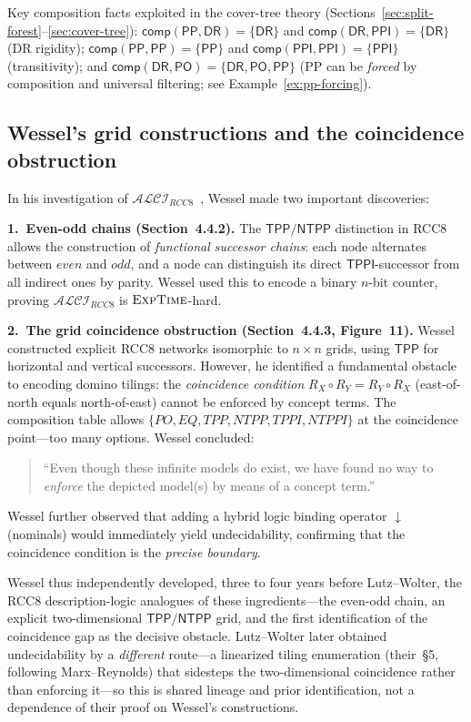 \documentclass[
]{ceurart}
\theoremstyle{definition}
\newcommand{\ALCIRCC}[1]{\ensuremath{\mathcal{ALCI}_{\mathit{RCC#1}}}}
\newcommand{\DR}{\ensuremath{\mathsf{DR}}}
\newcommand{\PO}{\ensuremath{\mathsf{PO}}}
\newcommand{\PP}{\ensuremath{\mathsf{PP}}}
\newcommand{\PPI}{\ensuremath{\mathsf{PPI}}}
\newcommand{\TPP}{\ensuremath{\mathsf{TPP}}}
\newcommand{\NTPP}{\ensuremath{\mathsf{NTPP}}}
\newcommand{\TPPI}{\ensuremath{\mathsf{TPPI}}}
\newcommand{\comp}{\ensuremath{\mathsf{comp}}}
\newcommand{\EXPTIME}{\textsc{ExpTime}}
\begin{document}
\noindent
Key composition facts exploited in the cover-tree theory
(Sections~\ref{sec:split-forest}--\ref{sec:cover-tree}):
$\comp(\PP,\DR) = \{\DR\}$ and $\comp(\DR,\PPI) = \{\DR\}$
(DR rigidity);
$\comp(\PP,\PP) = \{\PP\}$ and $\comp(\PPI,\PPI) = \{\PPI\}$
(transitivity);
and $\comp(\DR,\PO) = \{\DR,\PO,\PP\}$
(PP can be \emph{forced} by composition and universal filtering;
see Example~\ref{ex:pp-forcing}).

\subsection{Wessel's grid constructions and the coincidence obstruction}
\label{sec:wessel-grid}

In his investigation of $\ALCIRCC{8}$~\cite{Wessel2003}, Wessel
made two important discoveries:

\medskip\noindent\textbf{1.\ Even-odd chains (Section~4.4.2).}
The $\TPP/\NTPP$ distinction in RCC8 allows the construction of
\emph{functional successor chains}: each node alternates between
$\mathit{even}$ and $\mathit{odd}$, and a node can distinguish its
direct $\TPPI$-successor from all indirect ones by parity.
Wessel used this to encode a binary $n$-bit counter, proving
$\ALCIRCC{8}$ is $\EXPTIME$-hard.

\medskip\noindent\textbf{2.\ The grid coincidence obstruction (Section~4.4.3,
Figure~11).}
Wessel constructed explicit RCC8 networks isomorphic to
$n \times n$ grids, using $\TPP$ for horizontal and vertical
successors.  However, he identified a fundamental obstacle to
encoding domino tilings: the \emph{coincidence condition}
$R_X \circ R_Y = R_Y \circ R_X$ (east-of-north equals
north-of-east) cannot be enforced by concept terms.
The composition table allows $\{PO, EQ, TPP, NTPP, TPPI, NTPPI\}$
at the coincidence point---too many options.  Wessel concluded:
\begin{quote}
``Even though these infinite models do exist, we have found no way
to \emph{enforce} the depicted model(s) by means of a concept term.''
\end{quote}
Wessel further observed that adding a hybrid logic binding operator
$\downarrow$ (nominals) would immediately yield undecidability,
confirming that the coincidence condition is the \emph{precise
boundary}.

Wessel thus independently developed, three to four years before
Lutz--Wolter, the RCC8 description-logic analogues of these
ingredients---the even-odd chain, an explicit two-dimensional
$\TPP/\NTPP$ grid, and the first identification of the coincidence
gap as the decisive obstacle.  Lutz--Wolter later obtained
undecidability by a \emph{different} route---a linearized tiling
enumeration (their~\S5, following Marx--Reynolds) that sidesteps the
two-dimensional coincidence rather than enforcing it---so this is
shared lineage and prior identification, not a dependence of their
proof on Wessel's constructions.
\end{document}
